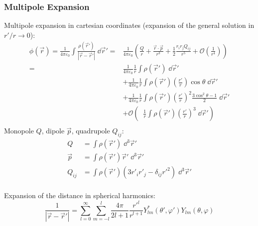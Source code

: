 		\subsubsection{Multipole Expansion}
			\noindent
			Multipole expansion in cartesian coordinates (expansion of the general solution in $r'/r \to 0$):
			\begin{equation}
				\begin{aligned}
					\phi(\vec{r}) = \frac{1}{4\pi\varepsilon_0}\int\frac{\rho(\vec{r}')}{\left|\vec{r}-\vec{r}'\right|}\;\dd \vec{r}'
					=& \frac{1}{4\pi\varepsilon_0}\left(\frac{Q}{r} + \frac{\vec{r}\cdot\vec{p}}{r^3} + \frac{1}{2}\frac{r_i r_j Q_{ij}}{r^5} + \mathcal{O} \left(\frac{1}{r^4}\right)\right) \\
					=& \frac{1}{4\pi\varepsilon_0}\frac{1}{r}\int\rho(\vec{r}')\;\dd \vec{r}' \\
					&+ \frac{1}{4\pi\varepsilon_0}\frac{1}{r}\int\rho(\vec{r}')\left(\frac{r'}{r}\right)\cos\theta\;\dd \vec{r}' \\
					&+ \frac{1}{4\pi\varepsilon_0}\frac{1}{r}\int\rho(\vec{r}')\left(\frac{r'}{r}\right)^2\frac{3\cos^2\theta-1}{2}\;\dd \vec{r}' \\
					&+ \mathcal{O}\left(\;\;\frac{1}{r}\int\rho(\vec{r}')\left(\frac{r'}{r}\right)^3 \;\dd \vec{r}'\right) \\
				\end{aligned}
			\end{equation}
			Monopole $Q$, dipole $\vec{p}$, quadrupole $Q_{ij}$:
			\begin{equation}
				\begin{aligned}
					Q &= \int \rho(\vec{r}') \;\dd^3 \vec{r}' \\
					\vec{p} &= \int \rho(\vec{r}')\vec{r}' \;\dd^3 \vec{r}' \\
					Q_{ij} &= \int \rho(\vec{r}')\left(3r'_i r'_j - \delta_{ij} r'^2 \right)	\;\dd^3 \vec{r}' \\
				\end{aligned}
			\end{equation}

			\noindent
			Expansion of the distance in spherical harmonics:
			\begin{equation}
				\frac{1}{\left|\vec{r}-\vec{r}'\right|}=\sum_{l=0}^{\infty}\sum_{m=-l}^{l} \frac{4\pi}{2l+1}\frac{r'^l}{r^{l+1}} Y^{*}_{lm}(\theta',\varphi')Y_{lm}(\theta,\varphi)
			\end{equation}

